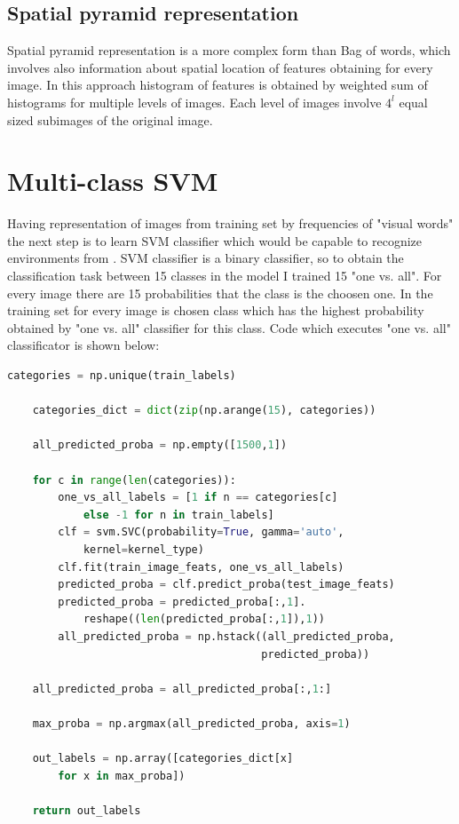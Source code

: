     \subsection*{Spatial pyramid representation}
Spatial pyramid representation is a more complex form than Bag of words, which involves also information about spatial location of features obtaining for every image. In this approach histogram of features is obtained by weighted sum of histograms for multiple levels of images. Each level of images involve $4^l$ equal sized subimages of the original image.

\section*{Multi-class SVM}
Having representation of images from training set by frequencies of "visual words" the next step is to learn SVM classifier which would be capable to recognize environments from \cite{lazebnik2006beyond}.
SVM classifier is a binary classifier, so to obtain the classification task between 15 classes in the model I trained 15 "one vs. all". For every image there are 15 probabilities that the class is the choosen one. In the training set for every image is chosen class which has the highest probability obtained by "one vs. all" classifier for this class. Code which executes "one vs. all" classificator is shown below:

\begin{lstlisting}[language=Python]
    categories = np.unique(train_labels)

    categories_dict = dict(zip(np.arange(15), categories))

    all_predicted_proba = np.empty([1500,1])

    for c in range(len(categories)):
        one_vs_all_labels = [1 if n == categories[c] 
            else -1 for n in train_labels]
        clf = svm.SVC(probability=True, gamma='auto', 
            kernel=kernel_type)
        clf.fit(train_image_feats, one_vs_all_labels)
        predicted_proba = clf.predict_proba(test_image_feats)
        predicted_proba = predicted_proba[:,1].
            reshape((len(predicted_proba[:,1]),1))
        all_predicted_proba = np.hstack((all_predicted_proba,
                                        predicted_proba))

    all_predicted_proba = all_predicted_proba[:,1:]

    max_proba = np.argmax(all_predicted_proba, axis=1)

    out_labels = np.array([categories_dict[x] 
        for x in max_proba])

    return out_labels
\end{lstlisting}

